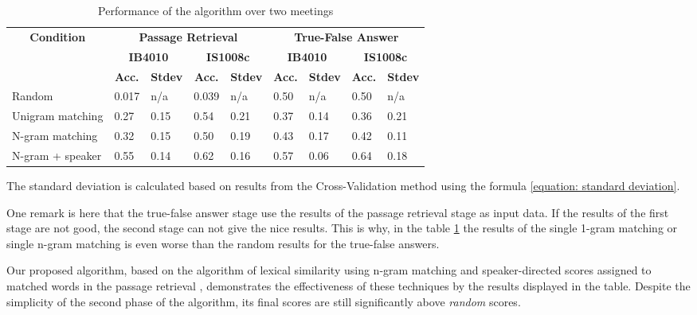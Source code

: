 \begin{table}[htbp]
\caption{Performance of the algorithm over two meetings}
\begin{center}
\begin{tabular}{|l|l|l|l|l|l|l|l|l|}
\hline
\multicolumn{ 1}{|c|}{\textbf{Condition}} & \multicolumn{ 4}{c|}{\textbf{Passage Retrieval}} & \multicolumn{ 4}{c|}{\textbf{True-False Answer}} \\ \cline{ 2- 9}
\multicolumn{ 1}{|c|}{} & \multicolumn{ 2}{c|}{\textbf{IB4010}} & \multicolumn{ 2}{c|}{\textbf{IS1008c}} & \multicolumn{ 2}{c|}{\textbf{IB4010}} & \multicolumn{ 2}{c|}{\textbf{IS1008c}} \\ \cline{ 2- 9}
\multicolumn{ 1}{|c|}{} & \multicolumn{1}{c|}{\textbf{Acc.}} & \multicolumn{1}{c|}{\textbf{Stdev}} & \multicolumn{1}{c|}{\textbf{Acc.}} & \multicolumn{1}{c|}{\textbf{Stdev}} & \multicolumn{1}{c|}{\textbf{Acc.}} & \multicolumn{1}{c|}{\textbf{Stdev}} & \multicolumn{1}{c|}{\textbf{Acc.}} & \multicolumn{1}{c|}{\textbf{Stdev}} \\ \hline
Random & 0.017 & n/a & 0.039 & n/a & 0.50 & n/a & 0.50 & n/a \\ \hline
Unigram matching & 0.27 & 0.15 & 0.54 & 0.21 & 0.37 & 0.14 & 0.36 & 0.21 \\ \hline
N-gram matching & 0.32 & 0.15 & 0.50 & 0.19 & 0.43 & 0.17 & 0.42 & 0.11 \\ \hline
N-gram + speaker & 0.55 & 0.14 & 0.62 & 0.16 & 0.57 & 0.06 & 0.64 & 0.18 \\ \hline
\end{tabular}
\end{center}
\label{Performance of the algorithm over two meetings}
\end{table}


The standard deviation is calculated based on results from the Cross-Validation method using the formula \ref{equation: standard deviation}.

One remark is here that the true-false answer stage use the results of the passage retrieval stage as input data. If the results of the first stage are not good, the second stage can not give the nice results. This is why, in the table \ref{Performance of the algorithm over two meetings} the results of the single 1-gram matching or single n-gram matching is even worse than the random results for the true-false answers.



Our proposed algorithm, based on the algorithm of lexical similarity using n-gram matching and speaker-directed scores assigned to matched words in the passage retrieval  \cite{lequocanh1}, demonstrates the effectiveness of these techniques by the results displayed in the table. Despite the simplicity of the second phase of the algorithm, its final scores are still significantly above \textit{random} scores.

